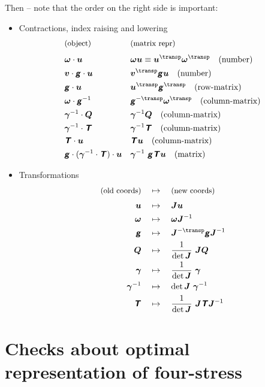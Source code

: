 \documentclass[\ifafour a4paper,12pt,\else a5paper,10pt,\fi%
onecolumn,oneside,article,%
british%
]{memoir}
\theoremstyle{remark}
\theoremstyle{innote}
\newcommand*{\mathte}[1]{\textbf{\textit{\textsf{#1}}}}
\renewcommand*{\|}[1][]{\nonscript\:#1\vert\nonscript\:\mathopen{}}
\newcommand*{\T}{^\transp}%
\newcommand*{\iT}{^{-\transp}}%
\newcommand*{\yg}{\mathte{g}}
\newcommand*{\ve}{\bm{\gamma}}
\newcommand*{\vi}{\bm{\gamma}^{-1}}
\newcommand*{\yQ}{\bm{Q}}
\newcommand*{\yT}{\mathte{T}}
\newcommand*{\yu}{\bm{u}}
\newcommand*{\yv}{\bm{v}}
\newcommand*{\yo}{\bm{\omega}}
\newcommand*{\yJ}{\bm{J}}
\begin{document}
Then -- note that the order on the right side is important:
\begin{itemize}
\item Contractions, index raising and lowering
  \begin{align}
    &\text{\small(object)}
    &&\text{\small(matrix repr)}
    \\[\jot]
    &\yo \cdot \yu
    &&\yo\yu \equiv \yu\T\yo\T
    \quad\text{(number)}
    \\
    &\yv\cdot\yg\cdot\yu
    &&\yv\T\yg\yu
    \quad\text{(number)}
    \\
    &\yg\cdot\yu
    &&\yu\T\yg\T
    \quad\text{(row-matrix)}
    \\
    &\yo\cdot\yg^{-1}
    &&\yg\iT\yo\T
    \quad\text{(column-matrix)}
    \\
    &\vi\cdot\yQ
    &&\vi\yQ
    \quad\text{(column-matrix)}
    \\
    &\vi\cdot\yT
    &&\vi\yT
    \quad\text{(column-matrix)}
    \\
    &\yT\cdot\yu
    &&\yT\yu
    \quad\text{(column-matrix)}
    \\
    &\yg\cdot(\vi\cdot\yT)\cdot\yu
    &&\vi\ \yg\yT\yu
    \quad\text{(matrix)}
  \end{align}

\item Transformations
  \begin{align}
    \text{\small(old coords)} &\quad\mapsto\quad\text{\small(new coords)}
    \\[\jot]
    \yu &\quad\mapsto\quad \yJ\yu
    \\
    \yo &\quad\mapsto\quad \yo\yJ^{-1}
    \\
    \yg &\quad\mapsto\quad \yJ\iT\yg\yJ^{-1}
    \\
    \yQ &\quad\mapsto\quad \frac{1}{\det\yJ}\ \yJ\yQ
    \\
    \ve &\quad\mapsto\quad \frac{1}{\det\yJ}\ \ve
    \\
    \vi &\quad\mapsto\quad \det\yJ\ \vi
    \\
    \yT &\quad\mapsto\quad \frac{1}{\det\yJ}\ \yJ\yT\yJ^{-1}
  \end{align}

\end{itemize}
\section{Checks about optimal representation of four-stress}
\label{sec:checks_4stress}
\end{document}
